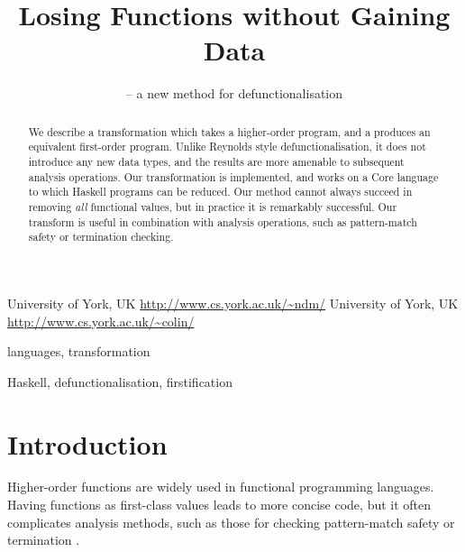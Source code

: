 \documentclass[preprint]{sigplanconf}
\begin{document}
\copyrightdata{[to be supplied]}

\titlebanner{} %
\preprintfooter{}   %

\title{Losing Functions without Gaining Data}
\subtitle{ -- a new method for defunctionalisation}

           {University of York, UK}
           {\url{http://www.cs.york.ac.uk/~ndm/}}
           {University of York, UK}
           {\url{http://www.cs.york.ac.uk/~colin/}}

\maketitle

\begin{abstract}
We describe a transformation which takes a higher-order program, and a produces an equivalent first-order program. Unlike Reynolds style defunctionalisation, it does not introduce any new data types, and the results are more amenable to subsequent analysis operations. Our transformation is implemented, and works on a Core language to which Haskell programs can be reduced. Our method cannot always succeed in removing \textit{all} functional values, but in practice it is remarkably successful. Our transform is useful in combination with analysis operations, such as pattern-match safety or termination checking.
\end{abstract}


\terms
languages, transformation

\keywords
Haskell, defunctionalisation, firstification

\section{Introduction}

Higher-order functions are widely used in functional programming languages.  Having functions as first-class values leads to more concise code, but it often complicates analysis methods, such as those for checking pattern-match safety \cite{me:catch} or termination \cite{sereni:higher_order_termination}.
\end{document}
